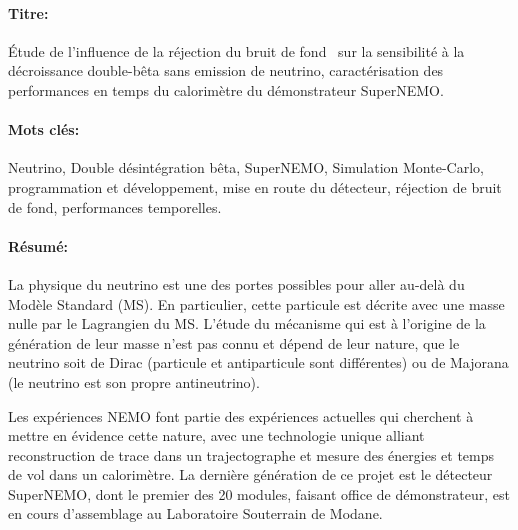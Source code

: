 


\begin{mdframed}[linecolor=Prune,linewidth=1]
\vspace{-.25cm}
\begin{footnotesize}
\paragraph*{Titre:} Étude de l'influence de la réjection du bruit de fond \Tl\ sur la sensibilité à la décroissance double-bêta sans emission de neutrino, caractérisation des performances en temps du calorimètre du démonstrateur SuperNEMO.

\vspace{-.25cm}
\paragraph*{Mots clés:} Neutrino, Double désintégration bêta, SuperNEMO, Simulation Monte-Carlo, programmation et développement, mise en route du détecteur, réjection de bruit de fond, performances temporelles.

\vspace{-.5cm}
\begin{multicols}{2}
\paragraph*{Résumé:} La physique du neutrino est une des portes possibles pour aller au-delà du Modèle Standard (MS).
En particulier, cette particule est décrite avec une masse nulle par le Lagrangien du MS.
L'étude du mécanisme qui est à l'origine de la génération de leur masse n'est pas connu et dépend de leur nature, que le neutrino soit de Dirac (particule et antiparticule sont différentes) ou de Majorana (le neutrino est son propre antineutrino).

Les expériences NEMO font partie des expériences actuelles qui cherchent à mettre en évidence cette nature, avec une technologie unique alliant reconstruction de trace dans un trajectographe et mesure des énergies et temps de vol dans un calorimètre.
La dernière génération de ce projet est le détecteur SuperNEMO, dont le premier des 20 modules, faisant office de démonstrateur, est en cours d'assemblage au Laboratoire Souterrain de Modane.


\end{multicols}
\end{footnotesize}
\end{mdframed}
